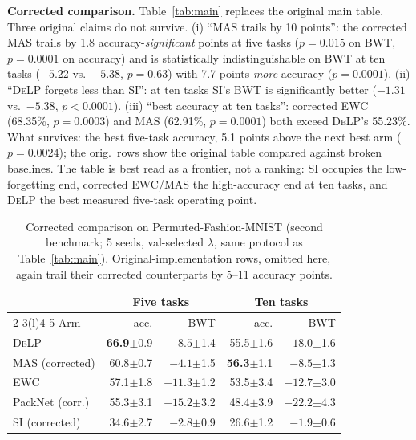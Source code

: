 \documentclass[conference]{IEEEtran}
\newcommand{\delp}{\textsc{DeLP}}
\begin{document}
\noindent\textbf{Corrected comparison.} Table~\ref{tab:main} replaces the original main table.
Three original claims do not survive. (i) ``MAS trails by 10 points'': the corrected MAS trails by
1.8 accuracy-\emph{significant} points at five tasks ($p=0.015$ on BWT, $p=0.0001$ on accuracy) and
is statistically indistinguishable on BWT at ten tasks ($-5.22$ vs.\ $-5.38$, $p=0.63$) with
7.7 points \emph{more} accuracy ($p=0.0001$). (ii) ``\delp{} forgets less than SI'': at ten tasks
SI's BWT is significantly better ($-1.31$ vs.\ $-5.38$, $p<0.0001$). (iii) ``best accuracy at ten
tasks'': corrected EWC (68.35\%, $p=0.0003$) and MAS (62.91\%, $p=0.0001$) both exceed \delp{}'s
55.23\%. What survives: the best five-task accuracy, 5.1 points above the next best arm
($p=0.0024$); the orig.\ rows show the original table compared against broken baselines. The table
is best read as a frontier, not a ranking: SI occupies the low-forgetting end, corrected EWC/MAS
the high-accuracy end at ten tasks, and \delp{} the best measured five-task operating point.

\begin{table}[t]
\centering
\caption{Corrected comparison on Permuted-Fashion-MNIST (second benchmark; 5 seeds, val-selected
$\lambda$, same protocol as Table~\ref{tab:main}). Original-implementation rows, omitted here,
again trail their corrected counterparts by 5--11 accuracy points.}
\label{tab:fashion}
\scriptsize
\setlength{\tabcolsep}{3.5pt}
\begin{tabular}{@{}lrrrr@{}}
\toprule
 & \multicolumn{2}{c}{Five tasks} & \multicolumn{2}{c}{Ten tasks} \\
\cmidrule(lr){2-3}\cmidrule(l){4-5}
Arm & acc. & BWT & acc. & BWT \\
\midrule
\delp{}           & \textbf{66.9}$\pm$0.9 & $-8.5$$\pm$1.4 & 55.5$\pm$1.6 & $-18.0$$\pm$1.6 \\
MAS (corrected)   & 60.8$\pm$0.7 & $-4.1$$\pm$1.5 & \textbf{56.3}$\pm$1.1 & $-8.5$$\pm$1.3 \\
EWC               & 57.1$\pm$1.8 & $-11.3$$\pm$1.2 & 53.5$\pm$3.4 & $-12.7$$\pm$3.0 \\
PackNet (corr.)   & 55.3$\pm$3.1 & $-15.2$$\pm$3.2 & 48.4$\pm$3.9 & $-22.2$$\pm$4.3 \\
SI (corrected)    & 34.6$\pm$2.7 & $\mathbf{-2.8}$$\pm$0.9 & 26.6$\pm$1.2 & $\mathbf{-1.9}$$\pm$0.6 \\
\bottomrule
\end{tabular}
\end{table}
\end{document}
